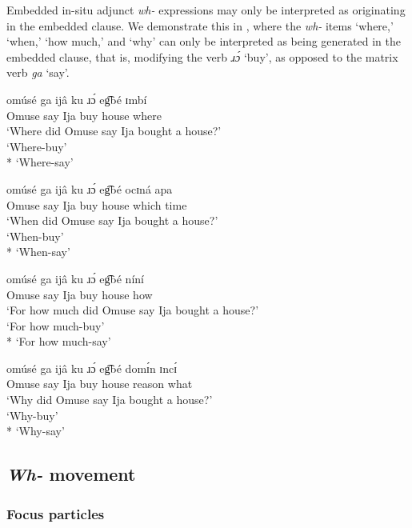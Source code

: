 \documentclass[output=paper,colorlinks,citecolor=brown
]{langscibook}
\begin{document}
\noindent Embedded in-situ adjunct \textit{wh-} expressions may only be interpreted as originating in the embedded clause. We demonstrate this in , where the \textit{wh-} items `where,' `when,' `how much,' and `why'  can only be interpreted as being generated in the embedded clause, that is, modifying the verb \textit{ɹɔ́} `buy', as opposed to the matrix verb \textit{ga} `say'.

\ea \label{ex:matte:8} 
\begin{xlist}

\ex \label{ex:matte:8a}
\gll omúsé ga ijâ ku ɹɔ́ eg͡bé ɪmbí\\
Omuse say Ija \Pfv{} buy house where\\
\glt `Where did Omuse say Ija bought a house?'\\
\langscicheckmark `Where-buy'\\
* `Where-say'

\ex \label{ex:matte:8b}
\gll omúsé ga ijâ ku ɹɔ́ eg͡bé ocɪná apa\\
Omuse say Ija \Pfv{} buy house which time\\
\glt `When did Omuse say Ija bought a house?'\\
\langscicheckmark `When-buy'\\
* `When-say'

\ex \label{ex:matte:8c}
\gll omúsé ga ijâ ku ɹɔ́ eg͡bé níní\\
Omuse say Ija \Pfv{} buy house how\\
\glt `For how much did Omuse say Ija bought a house?'\\
\langscicheckmark `For how much-buy'\\
* `For how much-say'

\ex \label{ex:matte:8d}
\gll omúsé ga ijâ ku ɹɔ́ eg͡bé domɪ́n ɪncɪ́\\
Omuse say Ija \Pfv{} buy house reason what\\
\glt `Why did Omuse say Ija bought a house?'\\
\langscicheckmark `Why-buy'\\
* `Why-say'

\end{xlist}
\z

\subsection{\textit{Wh-} movement} \label{sec:matte:3.2}

\subsubsection{Focus particles} \label{sec:matte:3.2.1}
\end{document}
